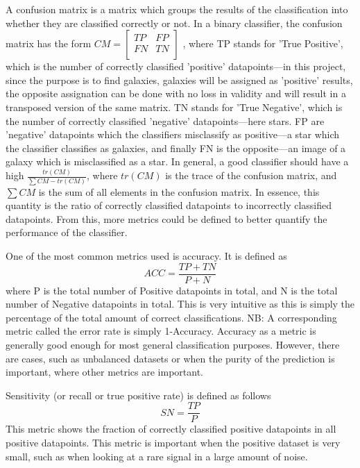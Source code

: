 \documentclass[a4paper,fleqn,usenatbib]{mnras}
\begin{document}
A confusion matrix is a matrix which groups the results of the classification into whether they are classified correctly or not. In a binary classifier, the confusion matrix has the form $CM=\begin{bmatrix}
           TP & FP \\
           FN & TN \\
         \end{bmatrix}$ , where TP stands for 'True Positive', which is the number of correctly classified 'positive' datapoints---in this project, since the purpose is to find galaxies, galaxies will be assigned as 'positive' results, the opposite assignation can be done with no loss in validity and will result in a transposed version of the same matrix. TN stands for 'True Negative', which is the number of correctly classified 'negative' datapoints---here stars. FP are 'negative' datapoints which the classifiers misclassify as positive---a star which the classifier classifies as galaxies, and finally FN is the opposite---an image of a galaxy which is misclassified as a star. In general, a good classifier should have a high $\frac{tr(CM)}{\sum{CM}-tr(CM)}$, where $tr(CM)$ is the trace of the confusion matrix, and $\sum{CM}$ is the sum of all elements in the confusion matrix. In essence, this quantity is the ratio of correctly classified datapoints to incorrectly classified datapoints. From this, more metrics could be defined to better quantify the performance of the classifier. 
         
 One of the most common metrics used is accuracy. It is defined as 
 \begin{equation}
 	ACC=\frac{TP+TN}{P+N}
 \end{equation}
  where P is the total number of Positive datapoints in total, and N is the total number of Negative datapoints in total. This is very intuitive as this is simply the percentage of the total amount of correct classifications. NB: A corresponding metric called the error rate is simply 1-Accuracy. Accuracy as a metric is generally good enough for most general classification purposes. However, there are cases, such as unbalanced datasets or when the purity of the prediction is important, where other metrics are important. 
  
  Sensitivity (or recall or true positive rate) is defined as follows
  \begin{equation}
  SN=\frac{TP}{P}	
  \end{equation}
This metric shows the fraction of correctly classified positive datapoints in all positive datapoints. This metric is important when the positive dataset is very small, such as when looking at a rare signal in a large amount of noise. 
\end{document}
